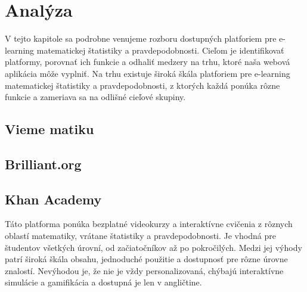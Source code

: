 \section{Analýza}
V tejto kapitole sa podrobne venujeme rozboru dostupných platforiem pre e-learning matematickej štatistiky a pravdepodobnosti. Cieľom je identifikovať platformy, porovnať ich funkcie a odhaliť medzery na trhu, ktoré naša webová aplikácia môže vyplniť. Na trhu existuje široká škála platforiem pre e-learning matematickej štatistiky a pravdepodobnosti, z ktorých každá ponúka rôzne funkcie a zameriava sa na odlišné cieľové skupiny.
\subsection{Vieme matiku}
\subsection{Brilliant.org}
\subsection{Khan Academy}
Táto platforma ponúka bezplatné videokurzy a interaktívne cvičenia z rôznych oblastí
matematiky, vrátane štatistiky a pravdepodobnosti. Je vhodná pre študentov všetkých
úrovní, od začiatočníkov až po pokročilých. Medzi jej výhody patrí široká škála obsahu,
jednoduché použitie a dostupnosť pre rôzne úrovne znalostí. Nevýhodou je, že nie je
vždy personalizovaná, chýbajú interaktívne simulácie a gamifikácia a dostupná je len v
angličtine.